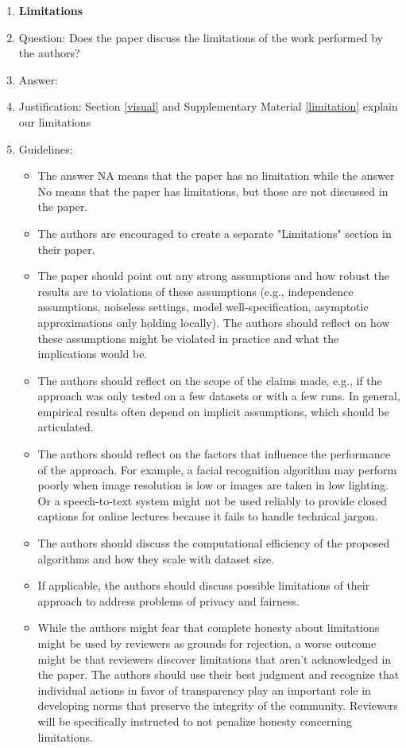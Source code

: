 \documentclass{article}
\begin{document}
\begin{enumerate}
\item {\bf Limitations}
    \item[] Question: Does the paper discuss the limitations of the work performed by the authors?
    \item[] Answer: \answerYes{} %
    \item[] Justification: Section \ref{visual} and  Supplementary Material \ref{limitation} explain our limitations
    \item[] Guidelines:
    \begin{itemize}
        \item The answer NA means that the paper has no limitation while the answer No means that the paper has limitations, but those are not discussed in the paper. 
        \item The authors are encouraged to create a separate "Limitations" section in their paper.
        \item The paper should point out any strong assumptions and how robust the results are to violations of these assumptions (e.g., independence assumptions, noiseless settings, model well-specification, asymptotic approximations only holding locally). The authors should reflect on how these assumptions might be violated in practice and what the implications would be.
        \item The authors should reflect on the scope of the claims made, e.g., if the approach was only tested on a few datasets or with a few runs. In general, empirical results often depend on implicit assumptions, which should be articulated.
        \item The authors should reflect on the factors that influence the performance of the approach. For example, a facial recognition algorithm may perform poorly when image resolution is low or images are taken in low lighting. Or a speech-to-text system might not be used reliably to provide closed captions for online lectures because it fails to handle technical jargon.
        \item The authors should discuss the computational efficiency of the proposed algorithms and how they scale with dataset size.
        \item If applicable, the authors should discuss possible limitations of their approach to address problems of privacy and fairness.
        \item While the authors might fear that complete honesty about limitations might be used by reviewers as grounds for rejection, a worse outcome might be that reviewers discover limitations that aren't acknowledged in the paper. The authors should use their best judgment and recognize that individual actions in favor of transparency play an important role in developing norms that preserve the integrity of the community. Reviewers will be specifically instructed to not penalize honesty concerning limitations.
    \end{itemize}


\end{enumerate}
\end{document}
